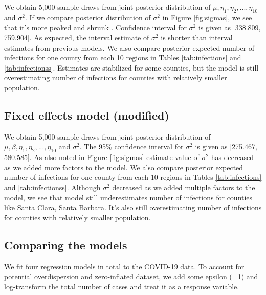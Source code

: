 \documentclass[11pt,twocolumn]{asaproc}
\begin{document}
We obtain 5,000 sample draws from joint posterior distribution of $\mu, \eta_1, \eta_2, ..., \eta_{10}$ and $\sigma^2$. If we compare posterior distribution of $\sigma^2$ in Figure \ref{fig:sigmas}, we see that it's more peaked and shrunk . Confidence interval for $\sigma^2$ is given as [338.809, 759.904].  As expected, the interval estimate of $\sigma^2$ is shorter than interval estimates from previous models. We also compare posterior expected number of infections for one county from each 10 regions in Tables \ref{tab:infections} and \ref{tab:infectionss}. Estimates are stabilized for some counties, but the model is still overestimating number of infections for counties with relatively smaller population. 




\subsection{Fixed effects model (modified)}

We obtain 5,000 sample draws from  joint posterior distribution of $\mu, \beta, \eta_1, \eta_2, ..., \eta_{10}$ and $\sigma^2$. The 95\% confidence interval for $\sigma^2$ is given as [275.467, 580.585]. As also noted in Figure \ref{fig:sigmas} estimate value of $\sigma^2$ has decreased as we added more factors to the model. We also compare posterior expected number of infections for one county from each 10 regions in Tables \ref{tab:infections} and \ref{tab:infectionss}.  Although $\sigma^2$ decreased as we added multiple factors to the model, we see that model still underestimates number of infections for counties like Santa Clara, Santa Barbara. It's also still overestimating number of infections for counties with relatively smaller population. 





\subsection{Comparing the models}

We fit four regression models in total to the COVID-19 data. To account for potential overdispersion and zero-inflated dataset, we add some epsilon (=1) and log-transform the total number of cases and treat it as a response variable.
\end{document}
